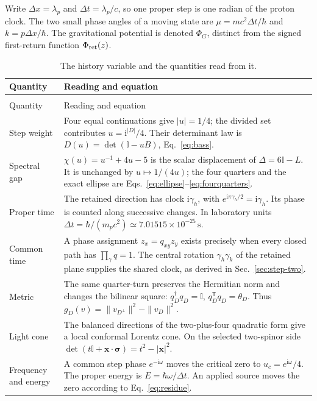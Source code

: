\documentclass[aps,prx,onecolumn,10pt,notitlepage,nofootinbib,longbibliography]{revtex4-2}
\numberwithin{equation}{section}
\numberwithin{table}{section}
\newcommand{\Id}{\mathbb I}
\newcommand{\ii}{\mathrm i}
\newcommand{\Phis}{\Phi_{\rm ret}}
\begin{document}
Write $\Delta x=\lambda_p$ and $\Delta t=\lambda_p/c$, so one proper step is one radian of the proton clock. The two small phase angles of a moving state are $\mu=mc^2\Delta t/\hbar$ and $k=p\Delta x/\hbar$. The gravitational potential is denoted $\Phi_G$, distinct from the signed first-return function $\Phis(z)$.

\begingroup\small
\setlength{\tabcolsep}{4pt}
\renewcommand{\arraystretch}{1.12}
\begin{longtable}{@{}>{\raggedright\arraybackslash}p{}>{\raggedright\arraybackslash}p{}@{}}
\caption{The history variable and the quantities read from it.}\label{tab:variablemap}\\
\toprule Quantity&Reading and equation\\\midrule
\endfirsthead
\multicolumn{2}{l}{\textit{The spectral variable and classical quantities, continued}}\\
\toprule Quantity&Reading and equation\\\midrule
\endhead
\bottomrule\endfoot
Step weight&Four equal continuations give $|u|=1/4$; the divided set contributes $u=\ii^{|D|}/4$. Their determinant law is $D(u)=\det(\Id-uB)$, Eq.~\eqref{eq:bass}.\\[4pt]
Spectral gap&$\chi(u)=u^{-1}+4u-5$ is the scalar displacement of $\Delta=6\Id-L$. It is unchanged by $u\mapsto1/(4u)$; the four quarters and the exact ellipse are Eqs.~\eqref{eq:ellipse}--\eqref{eq:fourquarters}.\\[4pt]
Proper time&The retained direction has clock $\ii\gamma_h$, with $e^{\ii\pi\gamma_h/2}=\ii\gamma_h$. Its phase is counted along successive changes. In laboratory units $\Delta t=\hbar/(m_pc^2)\simeq7.01515\times10^{-25}\,\mathrm s$.\\[4pt]
Common time&A phase assignment $z_x=q_{xy}z_y$ exists precisely when every closed path has $\prod_\gamma q=1$. The central rotation $\gamma_h\gamma_k$ of the retained plane supplies the shared clock, as derived in Sec.~\ref{sec:step-two}.\\[4pt]
Metric&The same quarter-turn preserves the Hermitian norm and changes the bilinear square: $q_D^\dagger q_D=\Id$, $q_D^{\mathsf T}q_D=\theta_D$. Thus $g_D(v)=\|v_{D^\perp}\|^2-\|v_D\|^2$.\\[4pt]
Light cone&The balanced directions of the two-plus-four quadratic form give a local conformal Lorentz cone. On the selected two-spinor side $\det(t\Id+\bm x\cdot\bm\sigma)=t^2-|\bm x|^2$.\\[4pt]
Frequency and energy&A common step phase $e^{-\ii\omega}$ moves the critical zero to $u_c=e^{\ii\omega}/4$. The proper energy is $E=\hbar\omega/\Delta t$. An applied source moves the zero according to Eq.~\eqref{eq:residue}.\\[4pt]

\end{longtable}
\end{document}
